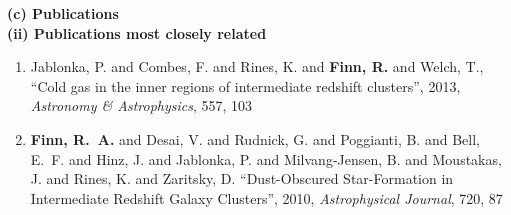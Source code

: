 \documentclass[11pt]{article}
\begin{document}
\begin{flushleft}
\medskip
{\bf (c) Publications} \\
\medskip
{\bf (ii) Publications most closely related} \\
\begin{enumerate}{\setlength{\leftmargin}{0in}}
\vspace{-.2cm}\item {Jablonka}, P. and {Combes}, F. and {Rines}, K. and {\bf {Finn}, R.} and 
	{Welch}, T., ``{Cold gas in the inner regions of intermediate
        redshift clusters}'', 2013, {\it Astronomy \& Astrophysics},
      557, 103
\vspace{-.2cm}
\item {\bf {Finn}, R.~A.} and {Desai}, V. and {Rudnick}, G. and {Poggianti}, B. and 
	{Bell}, E.~F. and {Hinz}, J. and {Jablonka}, P. and {Milvang-Jensen}, B. and 
	{Moustakas}, J. and {Rines}, K. and {Zaritsky}, D.
``Dust-Obscured Star-Formation in Intermediate Redshift Galaxy Clusters'', 2010,
{\it Astrophysical Journal}, 720, 87
\vspace{-.2cm}

\end{enumerate}
\end{flushleft}
\end{document}
